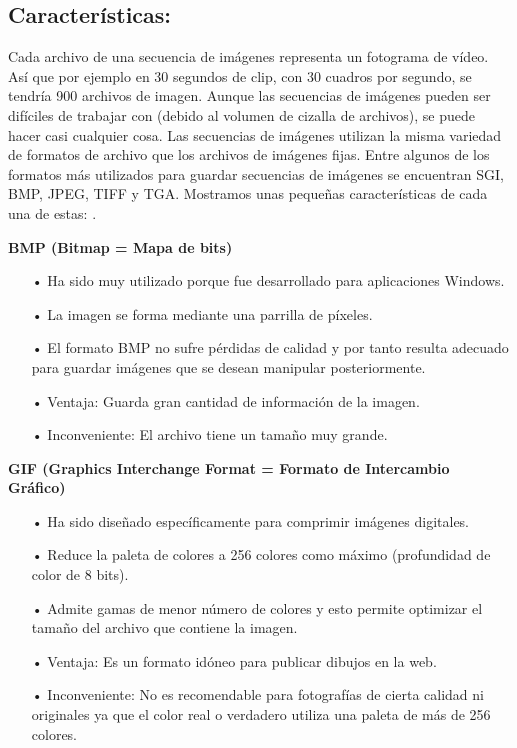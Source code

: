 \subsection{Características:}
Cada archivo de una secuencia de imágenes representa un fotograma de vídeo. Así que por ejemplo en 30 segundos de clip, con 30 cuadros por segundo, se tendría 900 archivos de imagen. Aunque las secuencias de imágenes pueden ser difíciles de trabajar con (debido al volumen de cizalla de archivos), se puede hacer casi cualquier cosa.
\vskip 0.1cm
Las secuencias de imágenes utilizan la misma variedad de formatos de archivo que los archivos de imágenes fijas. Entre algunos de los formatos más utilizados para guardar secuencias de imágenes se encuentran SGI, BMP, JPEG, TIFF y TGA. Mostramos unas pequeñas características de cada una de estas:
\vskip 0.1cm \cite{Web}.

{\bf BMP (Bitmap = Mapa de bits)} \vskip 0.1cm

\begin{itemize}
\item[•] Ha sido muy utilizado porque fue desarrollado para aplicaciones Windows.
\item[•] La imagen se forma mediante una parrilla de píxeles.
\item[•] El formato BMP no sufre pérdidas de calidad y por tanto resulta adecuado para guardar imágenes que se desean manipular posteriormente.
\item[•] Ventaja: Guarda gran cantidad de información de la imagen. 
\item[•] Inconveniente: El archivo tiene un tamaño muy grande.
\end{itemize}

{\bf GIF (Graphics Interchange Format = Formato de Intercambio Gráfico)} \vskip 0.1cm

\begin{itemize}
\item[•] Ha sido diseñado específicamente para comprimir imágenes digitales.
\item[•] Reduce la paleta de colores a 256 colores como máximo (profundidad de color de 8 bits).
\item[•] Admite gamas de menor número de colores y esto permite optimizar el tamaño del archivo que contiene la imagen.
\item[•] Ventaja: Es un formato idóneo para publicar dibujos en la web.
\item[•] Inconveniente: No es recomendable para fotografías de cierta calidad ni originales ya que el color real o verdadero utiliza una paleta de más de 256 colores.
\end{itemize}

